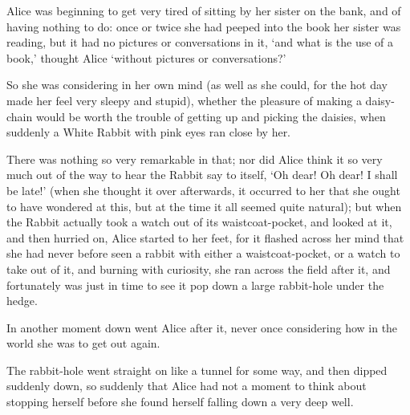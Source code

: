 \documentclass{article}
\begin{document}
\begin{figwindow}
	Alice was beginning to get very tired of sitting by her sister on the bank, and of having nothing to do: once or twice she had peeped into the book her sister was reading, but it had no pictures or conversations in it, ‘and what is the use of a book,’ thought Alice ‘without pictures or conversations?’

So she was considering in her own mind (as well as she could, for the hot day made her feel very sleepy and stupid), whether the pleasure of making a daisy-chain would be worth the trouble of getting up and picking the daisies, when suddenly a White Rabbit with pink eyes ran close by her.

There was nothing so very remarkable in that; nor did Alice think it so very much out of the way to hear the Rabbit say to itself, ‘Oh dear! Oh dear! I shall be late!’ (when she thought it over afterwards, it occurred to her that she ought to have wondered at this, but at the time it all seemed quite natural); but when the Rabbit actually took a watch out of its waistcoat-pocket, and looked at it, and then hurried on, Alice started to her feet, for it flashed across her mind that she had never before seen a rabbit with either a waistcoat-pocket, or a watch to take out of it, and burning with curiosity, she ran across the field after it, and fortunately was just in time to see it pop down a large rabbit-hole under the hedge.

In another moment down went Alice after it, never once considering how in the world she was to get out again.

The rabbit-hole went straight on like a tunnel for some way, and then dipped suddenly down, so suddenly that Alice had not a moment to think about stopping herself before she found herself falling down a very deep well.
\end{figwindow}
\end{document}
